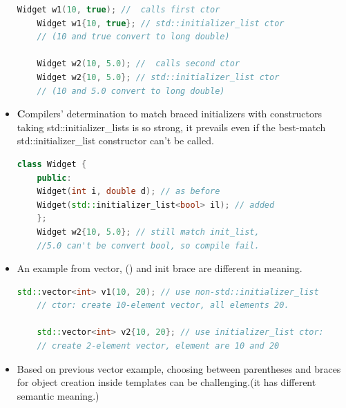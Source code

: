 \documentclass[a4paper,12pt,twoside]{book}
\begin{document}
\begin{itemize}
\begin{lstlisting}[frame=single, language=c++,mathescape=true]
	Widget w1(10, true); //  calls first ctor
	Widget w1{10, true}; // std::initializer_list ctor
	// (10 and true convert to long double)
	
	Widget w2(10, 5.0); //  calls second ctor
	Widget w2{10, 5.0}; // std::initializer_list ctor
	// (10 and 5.0 convert to long double)
	\end{lstlisting}
	
	\item \textbf Compilers' determination to match braced initializers with constructors taking std::initializer\_lists is so strong, it prevails even if the best-match std::initializer\_list constructor can't be called.
	\begin{lstlisting}[frame=single, language=c++,mathescape=true]
	class Widget {
	public:
	Widget(int i, double d); // as before
	Widget(std::initializer_list<bool> il); // added
	};
	Widget w2{10, 5.0}; // still match init_list,
	//5.0 can't be convert bool, so compile fail.
	\end{lstlisting}
	
	\item An example from vector, () and init brace are different in meaning.
	\begin{lstlisting}[frame=single, language=c++,mathescape=true]
	std::vector<int> v1(10, 20); // use non-std::initializer_list
	// ctor: create 10-element vector, all elements 20.
	
	std::vector<int> v2{10, 20}; // use initializer_list ctor:
	// create 2-element vector, element are 10 and 20
	\end{lstlisting}
	
	\item Based on previous vector example, choosing between parentheses and braces for object creation inside templates can be challenging.(it has different semantic meaning.)
	
	
\end{itemize}
\end{document}
